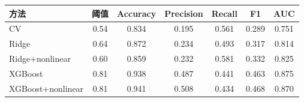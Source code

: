 \begin{tabular}{lcccccc}
\toprule
方法 & 阈值 & Accuracy & Precision & Recall & F1 & AUC \\ 
\midrule
CV & 0.54 & 0.834 & 0.195 & 0.561 & 0.289 & 0.751 \\ 
Ridge & 0.64 & 0.872 & 0.234 & 0.493 & 0.317 & 0.814 \\ 
Ridge+nonlinear & 0.60 & 0.859 & 0.232 & 0.581 & 0.332 & 0.825 \\ 
XGBoost & 0.81 & 0.938 & 0.487 & 0.441 & 0.463 & 0.875 \\ 
XGBoost+nonlinear & 0.81 & 0.941 & 0.508 & 0.434 & 0.468 & 0.870 \\ 
\bottomrule
\end{tabular}

